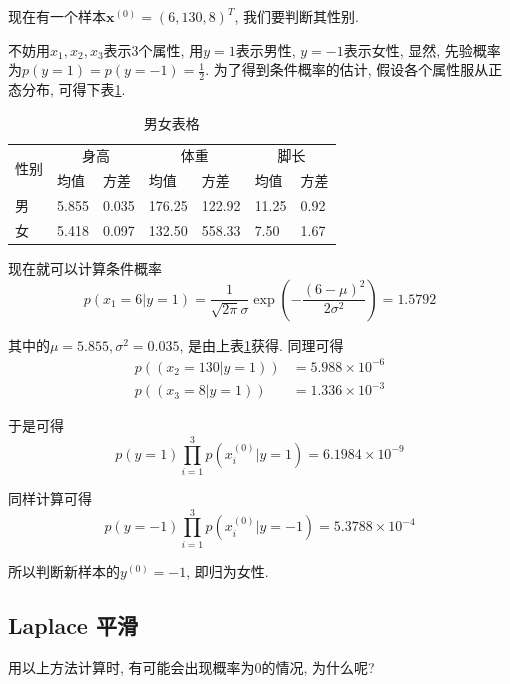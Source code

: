 \documentclass[a4paper,UTF8]{ctexart}
\theoremstyle{plain} \newtheorem{theorem}{定理}[section]
\theoremstyle{plain} \newtheorem{definition}{定义}[section]
\theoremstyle{plain} \newtheorem{lemma}{引理}[section]
\theoremstyle{plain} \newtheorem{proposition}{命题}[section]
\theoremstyle{plain} \newtheorem{example}{例}[section]
\theoremstyle{plain} \newtheorem{remark}{注}[section]
\theoremstyle{plain} \newtheorem{corollary}{推论}[section]
\begin{document}
现在有一个样本$\bm{x}^{(0)} = (6, 130, 8)^{T}$, 我们要判断其性别.

不妨用$x_1, x_2, x_3$表示$3$个属性, 用$y = 1$表示男性, $y = -1$表示女性, 显然, 先验概率为$p(y = 1) = p(y = -1) = \frac{1}{2}$. 为了得到条件概率的估计, 假设各个属性服从正态分布, 可得下表\ref{gender}.
\begin{table}[!htb]
\centering
\caption{男女表格}
\label{gender}\begin{tabular}{|l|l|l|l|l|l|l|}
\hline
\multirow{2}{*}{性别} & \multicolumn{2}{c|}{身高} & \multicolumn{2}{c|}{体重} & \multicolumn{2}{c|}{脚长} \\ \cline{2-7} 
                    & 均值         & 方差         & 均值          & 方差        & 均值          & 方差        \\ \hline
男                   & 5.855      & 0.035      & 176.25      & 122.92     & 11.25       & 0.92      \\ \hline
女                   & 5.418      & 0.097      & 132.50      & 558.33     & 7.50        & 1.67      \\ \hline
\end{tabular}
\end{table}

现在就可以计算条件概率
\begin{equation*}
p(x_1 = 6 | y = 1) = \frac{1}{\sqrt{2 \pi} \sigma} \exp \left( - \frac{(6 - \mu)^2}{2 \sigma^2} \right) = 1.5792
\end{equation*}

其中的$\mu = 5.855, \sigma^2 = 0.035$, 是由上表\ref{gender}获得. 同理可得
\begin{align*}
p((x_2 = 130 | y = 1)) & = 5.988 \times 10^{-6} \\ 
p((x_3 = 8 | y = 1)) & = 1.336 \times 10^{-3}
\end{align*}

于是可得
\begin{equation*}
p(y = 1) \prod_{i=1}^{3} p(x_{i}^{(0)} | y = 1) = 6.1984 \times 10^{-9}
\end{equation*}

同样计算可得
\begin{equation*}
p(y = - 1) \prod_{i=1}^{3} p(x_{i}^{(0)} | y = - 1) = 5.3788 \times 10^{-4}
\end{equation*}

所以判断新样本的$y^{(0)} = -1$, 即归为女性.


\subsection{Laplace 平滑}
用以上方法计算时, 有可能会出现概率为$0$的情况, 为什么呢?
\end{document}
